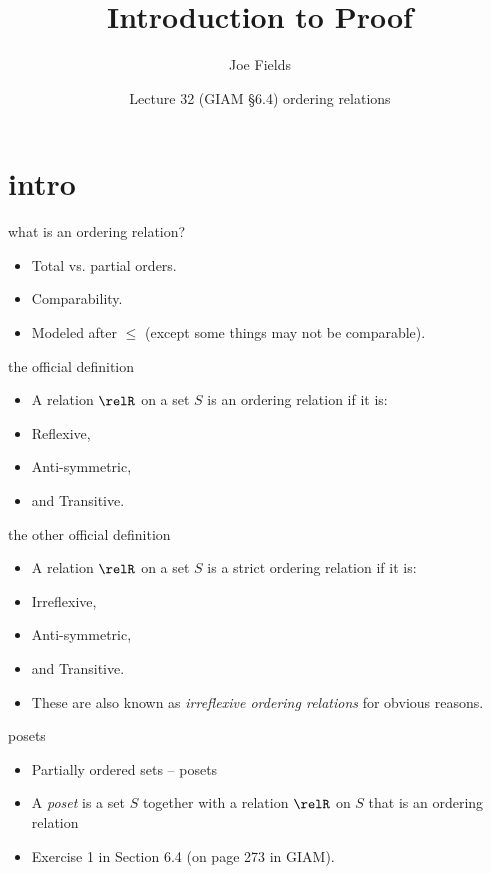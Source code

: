 \documentclass[handout,landscape]{beamer}
\author{Joe Fields}
\title{Introduction to Proof}
\date{Lecture 32 (GIAM \S 6.4) \newline ordering relations}
\institute[SCSU]{ {\tt fieldsj1@southernct.edu} }
\begin{document}
\begin{frame}[plain]
  \titlepage
\end{frame}

\section{intro}

\begin{frame}{what is an ordering relation?}
\begin{itemize}
\item Total vs. partial orders.\pause
\item Comparability.\pause
\item Modeled after $\leq$ (except some things may not be comparable).
\end{itemize}
\end{frame}

\begin{frame}{the official definition}
\begin{itemize}
\item A relation $\relR$ on a set $S$ is an ordering relation if it is:\pause
\item Reflexive,\pause
\item Anti-symmetric,\pause
\item and Transitive.
\end{itemize}
\end{frame}

\begin{frame}{the other official definition}
\begin{itemize}
\item A relation $\relR$ on a set $S$ is a strict ordering relation if it is:\pause
\item Irreflexive,\pause
\item Anti-symmetric,\pause
\item and Transitive. \pause
\item These are also known as {\em irreflexive ordering relations} for obvious reasons.
\end{itemize}
\end{frame}

\begin{frame}{posets}
\begin{itemize}
\item Partially ordered sets -- posets \pause
\item A {\em poset} is a set $S$ together with a relation $\relR$ on $S$ that is an ordering relation\pause
\item Exercise 1 in Section 6.4 (on page 273 in GIAM).
\end{itemize}
\end{frame}
\end{document}
